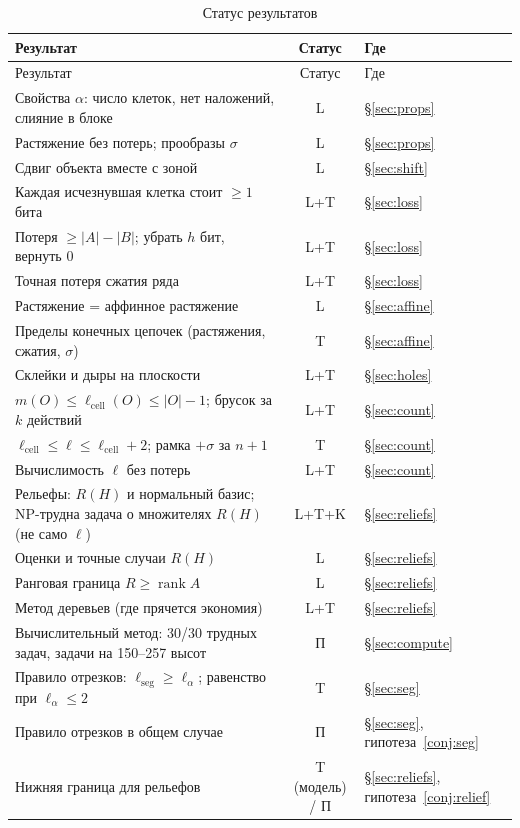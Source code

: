 \documentclass[11pt,a4paper]{article}
\theoremstyle{plain}
\theoremstyle{definition}
\theoremstyle{remark}
\newcommand{\lc}{\ell_{\mathrm{cell}}}
\newcommand{\lseg}{\ell_{\mathrm{seg}}}
\begin{document}
\begin{longtable}{p{}cp{}}
\caption{Статус результатов}\label{tab:status}\\
\toprule
Результат & Статус & Где\\
\midrule
\endfirsthead
\toprule Результат & Статус & Где\\ \midrule \endhead
Свойства $\alpha$: число клеток, нет наложений, слияние в блоке & L & §\ref{sec:props}\\
Растяжение без потерь; прообразы $\sigma$ & L & §\ref{sec:props}\\
Сдвиг объекта вместе с зоной & L & §\ref{sec:shift}\\
Каждая исчезнувшая клетка стоит $\ge1$ бита & L+T & §\ref{sec:loss}\\
Потеря $\ge|A|-|B|$; убрать $h$ бит, вернуть 0 & L+T & §\ref{sec:loss}\\
Точная потеря сжатия ряда & L+T &  §\ref{sec:loss}\\
Растяжение = аффинное растяжение & L & §\ref{sec:affine}\\
Пределы конечных цепочек (растяжения, сжатия, $\sigma$) & T & §\ref{sec:affine}\\
Склейки и дыры на плоскости & L+T & §\ref{sec:holes}\\
$m(O)\le\lc(O)\le|O|-1$; брусок за $k$ действий & L+T & §\ref{sec:count}\\
$\lc\le\ell\le\lc+2$; рамка $+\sigma$ за $n+1$ & T & §\ref{sec:count}\\
Вычислимость $\ell$ без потерь & L+T & §\ref{sec:count}\\
Рельефы: $R(H)$ и нормальный базис; NP-трудна задача о множителях $R(H)$ (не само $\ell$) & L+T+K & §\ref{sec:reliefs}\\
Оценки и точные случаи $R(H)$ & L & §\ref{sec:reliefs}\\
Ранговая граница $R\ge\operatorname{rank}A$ & L & §\ref{sec:reliefs}\\
Метод деревьев (где прячется экономия) & L+T & §\ref{sec:reliefs}\\
Вычислительный метод: 30/30 трудных задач, задачи на 150--257 высот & П & §\ref{sec:compute}\\
Правило отрезков: $\lseg\ge\ell_\alpha$; равенство при $\ell_\alpha\le2$ & T & §\ref{sec:seg}\\
Правило отрезков в общем случае & П & §\ref{sec:seg}, гипотеза~\ref{conj:seg}\\
Нижняя граница для рельефов & T (модель) / П & §\ref{sec:reliefs}, гипотеза~\ref{conj:relief}\\
\bottomrule
\end{longtable}
\end{document}
